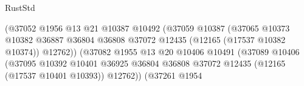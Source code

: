 \begin{lexlean}{RustStd}
\begin{coremodule}
                                                        (@37052
                                                          @1956
                                                          @13
                                                          @21
                                                          @10387
                                                          @10492
                                                          (@37059
                                                            @10387
                                                            (@37065
                                                              @10373
                                                              @10382
                                                              @36887
                                                              @36804
                                                              @36808
                                                              @37072
                                                              @12435
                                                              (@12165 (@17537 @10382 @10374))
                                                              @12762))
                                                          (@37082
                                                            @1955
                                                            @13
                                                            @20
                                                            @10406
                                                            @10491
                                                            (@37089
                                                              @10406
                                                              (@37095
                                                                @10392
                                                                @10401
                                                                @36925
                                                                @36804
                                                                @36808
                                                                @37072
                                                                @12435
                                                                (@12165 (@17537 @10401 @10393))
                                                                @12762))
                                                            (@37261
                                                              @1954

\end{coremodule}
\end{lexlean}
